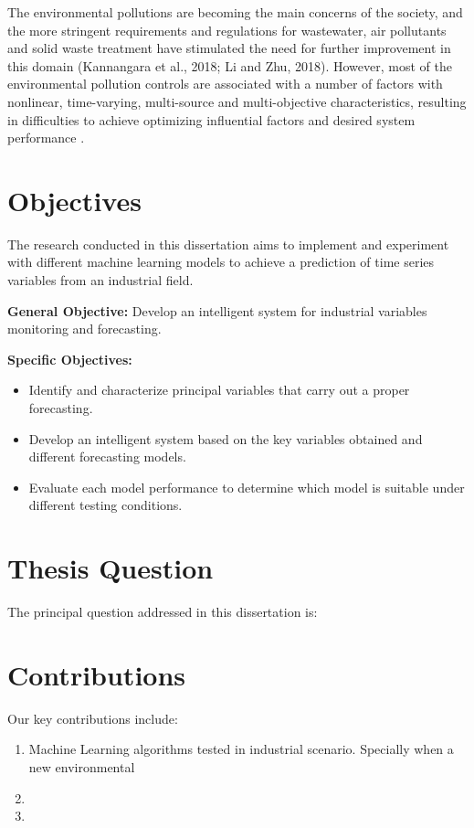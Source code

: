 The environmental pollutions are becoming the main concerns of the society, and the more stringent requirements and regulations for wastewater, air pollutants and solid waste treatment have stimulated the need for further improvement in this domain (Kannangara et al., 2018; Li and Zhu, 2018). However, most of the environmental pollution controls are associated with a number of factors with nonlinear, time-varying, multi-source and multi-objective characteristics, resulting in difficulties to achieve optimizing influential factors and desired system performance \cite{Ye2020}.

\section{Objectives}
\label{s:Objectives}
The research conducted in this dissertation aims to implement and experiment with different machine learning models to achieve a prediction of time series variables from an industrial field.


\textbf{General Objective:} Develop an intelligent system for industrial variables monitoring and forecasting.

\textbf{Specific Objectives:}

\begin{itemize}
\item Identify and characterize principal variables that carry out a proper forecasting.
\item Develop an intelligent system based on the key variables obtained and different forecasting models.
\item Evaluate each model performance to determine which model is suitable under different testing conditions.
\end{itemize}

\section{Thesis Question}
\label{s:Question}
The principal question addressed in this dissertation is:


\section{Contributions}
\label{s:Contributions}

Our key contributions include:

\begin{enumerate}

  \item Machine Learning algorithms tested in industrial scenario. Specially when a new environmental
  
  \item {}
  
  \item {}

\end{enumerate}

